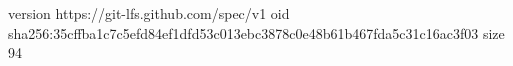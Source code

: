 version https://git-lfs.github.com/spec/v1
oid sha256:35cffba1c7c5efd84ef1dfd53c013ebc3878c0e48b61b467fda5c31c16ac3f03
size 94
